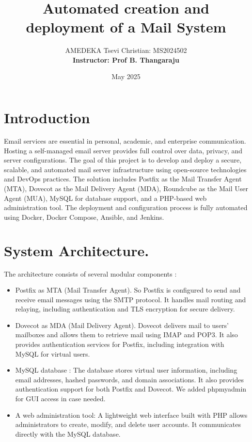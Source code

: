 \documentclass[12pt]{article}
\title{\textbf{Automated creation and deployment of a Mail System}}
\author{
    AMEDEKA Tsevi Christian: MS2024502
    \\[2\baselineskip]
    \textbf{Instructor: Prof B. Thangaraju}
}
\date{May 2025}
\begin{document}
\maketitle
\newpage
\listoffigures
\newpage

\section{Introduction}

Email services are essential in personal, academic, and enterprise communication. Hosting a self-managed email server provides full control over data, privacy, and server configurations. The goal of this project is to develop and deploy a secure, scalable, and automated mail server infrastructure using open-source technologies and DevOps practices. The solution includes Postfix as the Mail Transfer Agent (MTA), Dovecot as the Mail Delivery Agent (MDA), Roundcube as the Mail User Agent (MUA), MySQL for database support, and a PHP-based web administration tool. The deployment and configuration process is fully automated using Docker, Docker Compose, Ansible, and Jenkins.

\section{System Architecture. }
The architecture consists of several modular components :
\begin{itemize}
    \item Postfix as MTA (Mail Transfer Agent). So Postfix is configured to send and receive email messages using the SMTP protocol. It handles mail routing and relaying, including authentication and TLS encryption for secure delivery.

    \item Dovecot as MDA (Mail Delivery Agent).  Dovecot delivers mail to users' mailboxes and allows them to retrieve mail using IMAP and POP3. It also provides authentication services for Postfix, including integration with MySQL for virtual users.

    \item MySQL database : The database stores virtual user information, including email addresses, hashed passwords, and domain associations. It also provides authentication support for both Postfix and Dovecot.
    We added phpmyadmin for GUI access in case needed.

    \item A web administration tool: A lightweight web interface built with PHP allows administrators to create, modify, and delete user accounts. It communicates directly with the MySQL database.

\end{itemize}
\end{document}
